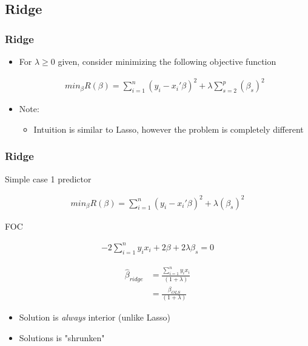 \documentclass[
  shownotes,
  xcolor={svgnames},
  hyperref={colorlinks,citecolor=DarkBlue,linkcolor=DarkRed,urlcolor=DarkBlue}
  , aspectratio=169]{beamer}
\begin{document}
\subsection{Ridge}
\begin{frame}[fragile]
\frametitle{Ridge}

\begin{itemize}
\item For $\lambda \geq 0$ given, consider minimizing the following objective function


\begin{align}
min_{\beta} R(\beta) = \sum_{i=1}^n (y_i-x_i'\beta)^2 + \lambda \sum_{s=2}^p (\beta_s)^2
\end{align}

\bigskip
\item Note:
\begin{itemize}
  \item Intuition is similar to Lasso, however the problem is completely different
\end{itemize}
\end{itemize}


\end{frame}
\begin{frame}[fragile]
\frametitle{Ridge}

Simple case 1 predictor

\begin{align}
min_{\beta} R(\beta) = \sum_{i=1}^n (y_i-x_i'\beta)^2 + \lambda  (\beta_s)^2
\end{align}

FOC

\begin{align}
-2 \sum_{i=1}^n  y_i x_i + 2\beta + 2 \lambda  \beta_s =0
\end{align}

\begin{align}
\hat{\beta}_{ridge} &= \frac{\sum_{i=1}^n  y_i x_i}{(1+ \lambda)} \nonumber \\
                    &= \frac{\beta_{OLS}}{(1+ \lambda)}
\end{align}

\begin{itemize}
\item Solution is {\it always} interior (unlike Lasso)
\item Solutions is "shrunken"
\end{itemize}
\end{frame}
\end{document}
